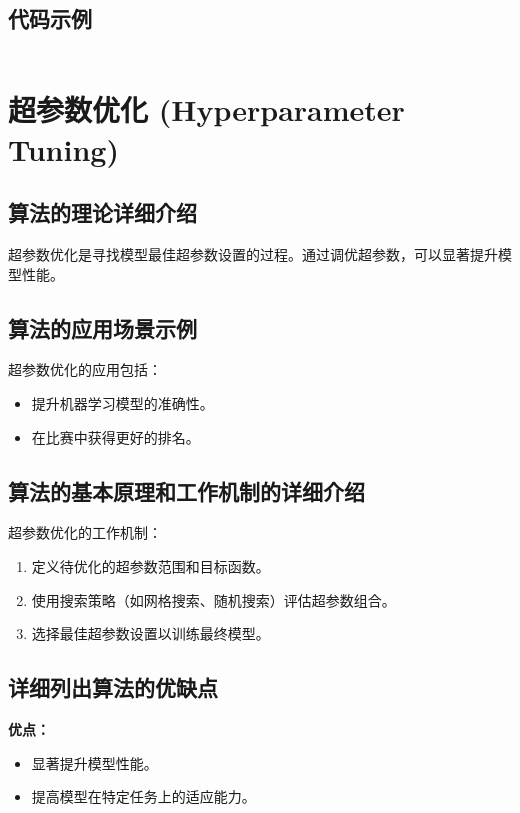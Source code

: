 \subsection*{代码示例}
\begin{lstlisting}

\end{lstlisting}


\section{超参数优化 (Hyperparameter Tuning)}
\subsection*{算法的理论详细介绍}
超参数优化是寻找模型最佳超参数设置的过程。通过调优超参数，可以显著提升模型性能。

\subsection*{算法的应用场景示例}
超参数优化的应用包括：
\begin{itemize}
    \item 提升机器学习模型的准确性。
    \item 在比赛中获得更好的排名。
\end{itemize}

\subsection*{算法的基本原理和工作机制的详细介绍}
超参数优化的工作机制：
\begin{enumerate}
    \item 定义待优化的超参数范围和目标函数。
    \item 使用搜索策略（如网格搜索、随机搜索）评估超参数组合。
    \item 选择最佳超参数设置以训练最终模型。
\end{enumerate}

\subsection*{详细列出算法的优缺点}
\textbf{优点：}
\begin{itemize}
    \item 显著提升模型性能。
    \item 提高模型在特定任务上的适应能力。
\end{itemize}

